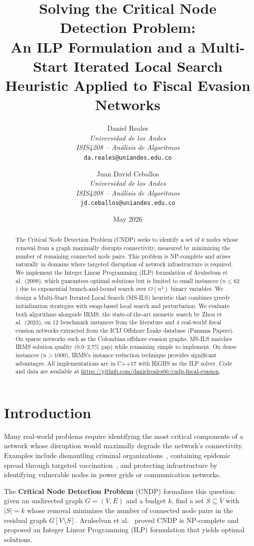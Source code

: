 \documentclass[11pt,a4paper]{article}
\title{Solving the Critical Node Detection Problem:\\An ILP Formulation and a Multi-Start Iterated Local Search Heuristic Applied to Fiscal Evasion Networks}
\author{
Daniel Reales \\
\textit{Universidad de los Andes} \\
\textit{ISIS4208 -- An\'alisis de Algoritmos} \\
\texttt{da.reales@uniandes.edu.co}
\and
Juan David Ceballos \\
\textit{Universidad de los Andes} \\
\textit{ISIS4208 -- An\'alisis de Algoritmos} \\
\texttt{jd.ceballos@uniandes.edu.co}
}
\date{May 2026}
\begin{document}
\maketitle

\begin{abstract}
The Critical Node Detection Problem (CNDP) seeks to identify a set of $k$ nodes whose removal from a graph maximally disrupts connectivity, measured by minimizing the number of remaining connected node pairs. This problem is NP-complete and arises naturally in domains where targeted disruption of network infrastructure is required. We implement the Integer Linear Programming (ILP) formulation of Arulselvan et al.\ (2009), which guarantees optimal solutions but is limited to small instances ($n \leq 62$) due to exponential branch-and-bound search over $O(n^2)$ binary variables. We design a Multi-Start Iterated Local Search (MS-ILS) heuristic that combines greedy initialization strategies with swap-based local search and perturbation. We evaluate both algorithms alongside IRMS, the state-of-the-art memetic search by Zhou et al.\ (2023), on 12 benchmark instances from the literature and 4 real-world fiscal evasion networks extracted from the ICIJ Offshore Leaks database (Panama Papers). On sparse networks such as the Colombian offshore evasion graphs, MS-ILS matches IRMS solution quality (0.0--2.7\% gap) while remaining simple to implement. On dense instances ($n > 1000$), IRMS's instance reduction technique provides significant advantages. All implementations are in C++17 with HiGHS as the ILP solver. Code and data are available at \url{https://github.com/danielreales00/cndp-fiscal-evasion}.
\end{abstract}

\section{Introduction}

Many real-world problems require identifying the most critical components of a network whose disruption would maximally degrade the network's connectivity. Examples include dismantling criminal organizations~\cite{arulselvan2009}, containing epidemic spread through targeted vaccination~\cite{borgatti2006}, and protecting infrastructure by identifying vulnerable nodes in power grids or communication networks.

The \textbf{Critical Node Detection Problem} (CNDP) formalizes this question: given an undirected graph $G = (V, E)$ and a budget $k$, find a set $S \subseteq V$ with $|S| = k$ whose removal minimizes the number of connected node pairs in the residual graph $G[V \setminus S]$. Arulselvan et al.~\cite{arulselvan2009} proved CNDP is NP-complete and proposed an Integer Linear Programming (ILP) formulation that yields optimal solutions.
\end{document}
